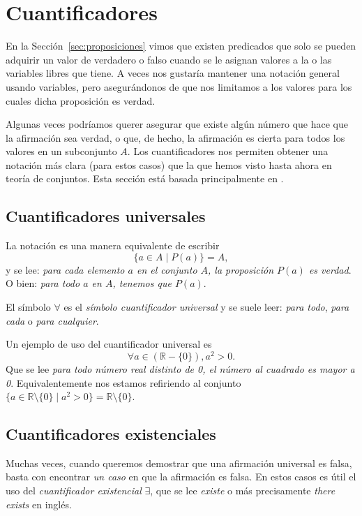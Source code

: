 \documentclass[12pt]{book}
\begin{document}
\section{Cuantificadores}
\noindent
En la Sección~\ref{sec:proposiciones} vimos que existen predicados que solo se pueden adquirir un valor de verdadero o falso cuando se le asignan valores a la o las variables libres que tiene. A veces nos gustaría mantener una notación general usando variables, pero asegurándonos de que nos limitamos a los valores para los cuales dicha proposición es verdad. 

Algunas veces podríamos querer asegurar que existe algún número que hace que la afirmación sea verdad, o que, de hecho, la afirmación es cierta para todos los valores en un subconjunto $A$. Los cuantificadores nos permiten obtener una notación más clara (para estos casos) que la que hemos visto hasta ahora en teoría de conjuntos. Esta sección está basada principalmente en \cite[Part II, Chapter 7]{eccles2013introduction}.

\subsection{Cuantificadores universales}

La notación  es una manera equivalente de escribir
\[
\{a\in A \mid P(a)\}=A,
\]
y se lee: \textit{para cada elemento $a$ en el conjunto $A$, la proposición $P(a)$ es verdad}. O bien: \textit{para todo $a$ en $A$, tenemos que $P(a)$}.

El símbolo $\forall$ es el \textit{símbolo cuantificador universal} y se suele leer: \textit{para todo}, \textit{para cada} o \textit{para cualquier}.

\begin{exampleenv}
    Un ejemplo de uso del cuantificador universal es
    \[
        \forall a\in (\mathbb{R}-\{0\}), a^2>0.
    \]
    Que se lee \textit{para todo número real distinto de 0, el número al cuadrado es mayor a 0}. Equivalentemente nos estamos refiriendo al conjunto $\{a\in\mathbb{R}\setminus\{0\}\mid a^2>0\}=\mathbb{R}\setminus \{0\}.$
\end{exampleenv}

\subsection{Cuantificadores existenciales}
\noindent
Muchas veces, cuando queremos demostrar que una afirmación universal es falsa, basta con encontrar \textit{un caso} en que la afirmación es falsa. En estos casos es útil el uso del \textit{cuantificador existencial} $\exists$, que se lee \textit{existe} o más precisamente \textit{there exists} en inglés.\\
\end{document}
